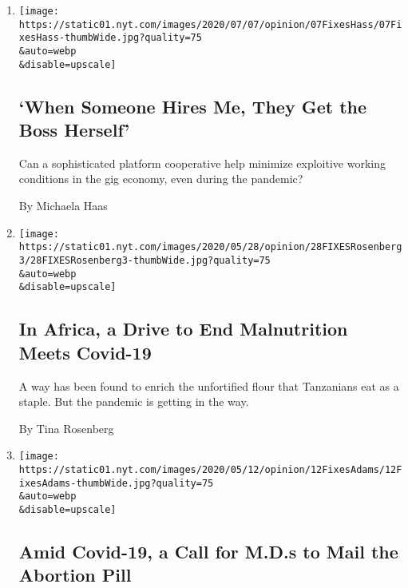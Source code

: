 \begin{enumerate}
\def\labelenumi{\arabic{enumi}.}
\item
  \href{/2020/07/07/opinion/gig-economy-immigrants-fair-wage.html}{}

  \texttt{[image: https://static01.nyt.com/images/2020/07/07/opinion/07FixesHass/07FixesHass-thumbWide.jpg?quality=75\\\&auto=webp\\\&disable=upscale]}

  \hypertarget{when-someone-hires-me-they-get-the-boss-herself}{%
  \subsection{`When Someone Hires Me, They Get the Boss
  Herself'}\label{when-someone-hires-me-they-get-the-boss-herself}}

  Can a sophisticated platform cooperative help minimize exploitive
  working conditions in the gig economy, even during the pandemic?

  By Michaela Haas
\item
  \href{/2020/05/28/opinion/coronavirus-africa-malnutrition.html}{}

  \texttt{[image: https://static01.nyt.com/images/2020/05/28/opinion/28FIXESRosenberg3/28FIXESRosenberg3-thumbWide.jpg?quality=75\\\&auto=webp\\\&disable=upscale]}

  \hypertarget{in-africa-a-drive-to-end-malnutrition-meets-covid-19}{%
  \subsection{In Africa, a Drive to End Malnutrition Meets
  Covid-19}\label{in-africa-a-drive-to-end-malnutrition-meets-covid-19}}

  A way has been found to enrich the unfortified flour that Tanzanians
  eat as a staple. But the pandemic is getting in the way.

  By Tina Rosenberg
\item
  \href{/2020/05/12/opinion/covid-abortion-pill.html}{}

  \texttt{[image: https://static01.nyt.com/images/2020/05/12/opinion/12FixesAdams/12FixesAdams-thumbWide.jpg?quality=75\\\&auto=webp\\\&disable=upscale]}

  \hypertarget{amid-covid-19-a-call-for-mds-to-mail-the-abortion-pill}{%
  \subsection{Amid Covid-19, a Call for M.D.s to Mail the Abortion
  Pill}\label{amid-covid-19-a-call-for-mds-to-mail-the-abortion-pill}}


\end{enumerate}
